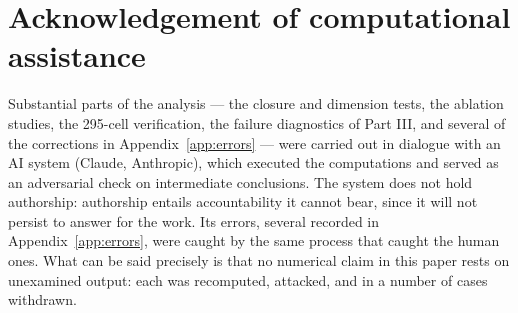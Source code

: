 \documentclass[11pt,a4paper]{article}
\theoremstyle{definition}
\begin{document}
\section*{Acknowledgement of computational assistance}
Substantial parts of the analysis --- the closure and dimension tests, the
ablation studies, the 295-cell verification, the failure diagnostics of Part
III, and several of the corrections in Appendix~\ref{app:errors} --- were
carried out in dialogue with an AI system (Claude, Anthropic), which executed
the computations and served as an adversarial check on intermediate conclusions.
The system does not hold authorship: authorship entails accountability it cannot
bear, since it will not persist to answer for the work. Its errors, several
recorded in Appendix~\ref{app:errors}, were caught by the same process that
caught the human ones. What can be said precisely is that no numerical claim in
this paper rests on unexamined output: each was recomputed, attacked, and in a
number of cases withdrawn.
\end{document}
